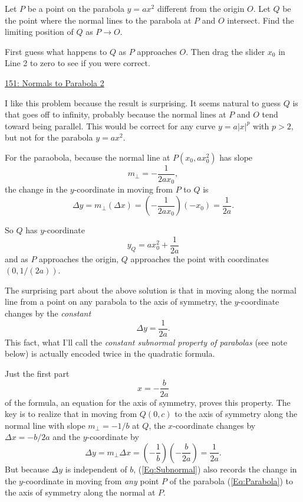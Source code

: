 \documentclass{ximera}
\begin{document}
\begin{exercise}
Let $P$ be a point on the parabola $y=ax^2$ different from the origin $O$. Let $Q$ be the point where the normal lines to the parabola at $P$ and $O$ intersect. Find the limiting position of $Q$ as $P\to O$.

\begin{exploration}
First guess what happens to $Q$ as $P$ approaches $O$. Then drag the slider $x_0$ in Line 2 to zero to see if you were correct.
\begin{onlineOnly}
    \begin{center}
\end{center}
\end{onlineOnly}

\href{https://www.desmos.com/calculator/4noszgo6dj}{151: Normals to Parabola 2}
\end{exploration}

\begin{explanation}
I like this problem because the result is surprising. It seems natural to guess $Q$ is that goes off to infinity, probably because the normal lines at $P$ and $O$ tend toward being parallel. This would be correct for any curve $y=a|x|^p$ with $p>2$, but not for the parabola $y=ax^2$.

For the paraobola, because the normal line at $P(x_0,ax_0^2)$ has slope
\[
        m_\perp = -\frac{1}{2ax_0} ,
\] 
the change in the $y$-coordinate in moving from $P$ to $Q$ is %
\[
 \Delta y =  m_\perp (\Delta x) =  \left( -\frac{1}{2ax_0}\right)(-x_0)  = \frac{1}{2a} .
\]

So $Q$ has $y$-coordinate
\[
     y_Q = ax_0^2 + \frac{1}{2a}
\]
and as $P$ approaches the origin, $Q$ approaches the point with coordinates $(0,1/(2a))$.
\end{explanation}
\end{exercise}

The surprising part about the above solution is that in moving along the normal line from a point on any parabola to the axis of symmetry, the $y$-coordinate changes by the \emph{constant}
\[
   \Delta y = \frac{1}{2a} .
\]
This fact, what I'll call the \emph{constant subnormal property of parabolas} (see note below) is actually encoded twice in the quadratic formula. 

Just the first part 
\[
    x = -\frac{b}{2a}
\]
of the formula, an equation for the axis of symmetry, proves this property. The key is to realize that in moving from $Q(0,c)$ to the axis of symmetry along the normal line with slope $m_\perp = -1/b$ at $Q$, the $x$-coordinate changes by $\Delta x = -b/2a$ and the $y$-coordinate by
\begin{equation}
 \Delta y = m_\perp \Delta x = \left( -\frac{1}{b}\right) \left(- \frac{b}{2a}  \right)= \frac{1}{2a} .  \label{Eq:Subnormal}
\end{equation}
But because $\Delta y$ is independent of $b$, (\ref{Eq:Subnormal}) also records the change in the $y$-coordinate in moving from \emph{any} point $P$ of the parabola (\ref{Eq:Parabola}) to the axis of symmetry along the normal at $P$.
\end{document}
